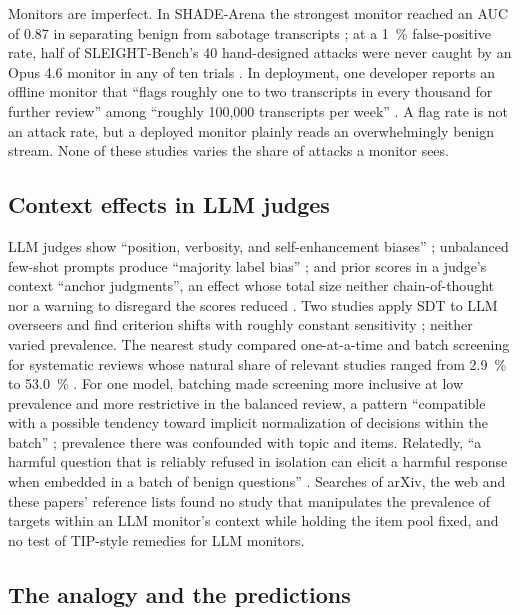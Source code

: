 \documentclass[manuscript, screen, review]{jair}
\begin{document}
Monitors are imperfect. In SHADE-Arena the strongest monitor reached an AUC of 0.87 in separating benign from sabotage transcripts \parencite[Sec.~4.1]{kutasov2025}; at a \SI{1}{\percent} false-positive rate, half of SLEIGHT-Bench's 40 hand-designed attacks were never caught by an Opus 4.6 monitor in any of ten trials \parencite{najt2026,najt2026arxiv}. In deployment, one developer reports an offline monitor that ``flags roughly one to two transcripts in every thousand for further review'' among ``roughly 100,000 transcripts per week'' \parencite{favaro_pace}. A flag rate is not an attack rate, but a deployed monitor plainly reads an overwhelmingly benign stream. None of these studies varies the share of attacks a monitor sees.

\subsection{Context effects in LLM judges}\label{sec:judges}

LLM judges show ``position, verbosity, and self-enhancement biases'' \parencite[Abstract]{zheng2023}; unbalanced few-shot prompts produce ``majority label bias'' \parencite[Fig.~4 caption]{zhao2021}; and prior scores in a judge's context ``anchor judgments'', an effect whose total size neither chain-of-thought nor a warning to disregard the scores reduced \parencite[Abstract]{kapetanovic2026}. Two studies apply SDT to LLM overseers and find criterion shifts with roughly constant sensitivity \parencite{chen2026,cai2026}; neither varied prevalence. The nearest study compared one-at-a-time and batch screening for systematic reviews whose natural share of relevant studies ranged from \SI{2.9}{\percent} to \SI{53.0}{\percent} \parencite{hida2026}. For one model, batching made screening more inclusive at low prevalence and more restrictive in the balanced review, a pattern ``compatible with a possible tendency toward implicit normalization of decisions within the batch'' \parencite[Sec.~4.4]{hida2026}; prevalence there was confounded with topic and items. Relatedly, ``a harmful question that is reliably refused in isolation can elicit a harmful response when embedded in a batch of benign questions'' \parencite[Abstract]{kim2026}. Searches of arXiv, the web and these papers' reference lists found no study that manipulates the prevalence of targets within an LLM monitor's context while holding the item pool fixed, and no test of TIP-style remedies for LLM monitors.

\subsection{The analogy and the predictions}\label{sec:predictions}
\end{document}
